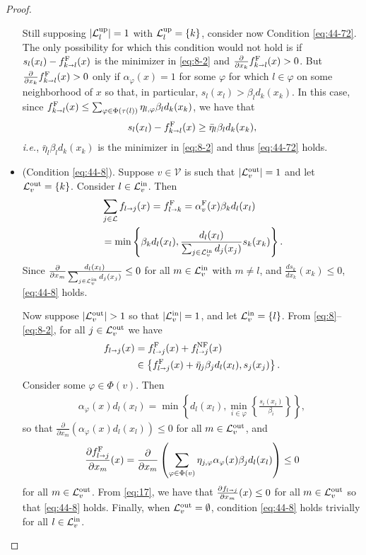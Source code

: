 \documentclass[letterpaper, 10 pt, conference]{ieeeconf}
\newcommand{\sra}{\shortrightarrow}
\newcommand{\fluxout}{d}
\newcommand{\Verts}{\mathcal{V}}
\newcommand{\Links}{\mathcal{L}}
\newcommand{\Lin}{\mathcal{L}^\textnormal{in}}
\newcommand{\Lout}{\mathcal{L}^\textnormal{out}}
\newcommand{\Lup}{\mathcal{L}^\textnormal{up}}
\newcommand{\tail}{{\tau}}
\newcommand{\flow}{f}
\newcommand{\alphaF}{\alpha^\textnormal{F}}
\renewcommand{\phi}{\varphi}
\begin{document}
\begin{proof}
\begin{itemize}[leftmargin=*]
Still supposing $|\Lup_l|=1$ with $\Lup_l=\{k\}$, consider now Condition \ref{eq:44-72}. The only possibility for which this condition would not hold is if $  s_l(x_l)-\fF_{k\sra l}(x)$ is the minimizer in \eqref{eq:8-2} and $  \frac{\partial}{\partial x_k}\fF_{k\sra l}(x)>0$. But
$\frac{\partial}{\partial x_k}\fF_{k\sra l}(x)>0$
only if $\alpha_\phi(x)=1$ for some $\phi$ for which $l\in\phi$ on some neighborhood of $x$ so that, in particular, $s_l(x_l)>\beta_ld_k(x_k)$. In this case, since $\fF_{k\sra l}(x)\leq \sum_{\phi\in\Phi(\tail(l))}\eta_{l,\phi}\beta_l\fluxout_k(x_k)$, we have that
\begin{align}
  \label{eq:22}
  s_l(x_l)-\fF_{k\sra l}(x)\geq \bar{\eta}_l\beta_l\fluxout_k(x_k),
\end{align}
\emph{i.e.}, $\bar{\eta}_l\beta_l\fluxout_k(x_k)$ is the minimizer in \eqref{eq:8-2} and thus \ref{eq:44-72} holds.

    \item    (Condition \ref{eq:44-8}). 
 Suppose $v\in\Verts$ is such that $|\Lout_v|=1$ and let $\Lout_v=\{k\}$. Consider $l\in\Lin_v$. Then
\begin{align}
  \label{eq:12}
&  \sum_{j\in\Links}\flow_{l\sra j}(x) = \fF_{l\sra k} = \alphaF_v(x)\beta_kd_l(x_l)\\
&=\min\left\{\beta_kd_l(x_l),\frac{d_l(x_l)}{\sum_{j\in\Lin_v}d_j(x_j)}s_k(x_k)\right\}.
\end{align}
Since $\frac{\partial}{\partial x_m}\frac{d_l(x_l)}{\sum_{j\in\Lin_v}d_j(x_j)}\leq 0$ for all $m\in\Lin_v$ with $m\neq l$, and $\frac{ds_k}{dx_k}(x_k)\leq 0$, \ref{eq:44-8} holds.

 Now suppose $|\Lout_v|>1$ so that $|\Lin_v|=1$, and let $\Lin_v=\{l\}$. 
From \eqref{eq:8}--\eqref{eq:8-2}, for all $j\in\Lout_v$ we have
\begin{align}
  \label{eq:17}
  \flow_{l\sra j}(x)&=\fF_{l\sra j}(x)+ \fNF_{l\sra j}(x)\\
&\in\left\{\fF_{l\sra j}(x)+\bar{\eta}_j\beta_j\fluxout_l(x_l),s_j(x_j)\right\}.
\end{align}
Consider some $\phi\in\Phi(v)$. Then 
\begin{align}
  \label{eq:16}
   \alpha_\phi(x) \fluxout_l(x_l)=\min\left\{\fluxout_l(x_l),\min_{i\in\phi}\left\{\frac{s_i(x_i)}{\beta_i}\right\}\right\},
\end{align}
so that $\frac{\partial}{\partial x_m}(   \alpha_\phi(x) \fluxout_l(x_l))\leq 0$ for all $m\in\Lout_v$, and
\begin{align}
  \label{eq:15}
  \frac{\partial \fF_{l\sra j}}{\partial x_m}(x)=  \frac{\partial}{\partial x_m}\left(\sum_{\phi\in\Phi(v)}\eta_{j,\phi}  \alpha_\phi(x) \beta_j\fluxout_l(x_l)\right)\leq 0
\end{align}
for all $m\in\Lout_v$. From \eqref{eq:17}, we have that $  \frac{\partial\flow_{l\sra j}}{\partial x_m}(x)\leq 0$ for all $m\in\Lout_v$ so that \ref{eq:44-8} holds. Finally, when $\Lout_{v}=\emptyset$, condition \ref{eq:44-8} holds trivially for all $l\in\Lin_v$.
   

\end{itemize}
\end{proof}
\end{document}
